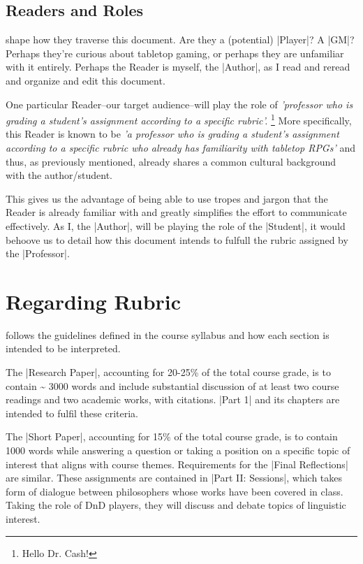 \documentclass[10pt,twoside,twocolumn,openany,nomultitoc]{book}
\begin{document}
 \subsection{Readers and Roles}   
     shape how they traverse this document.  Are they a (potential) |Player|? A |GM|? Perhaps they're curious about tabletop gaming, or perhaps they are unfamiliar with it entirely. Perhaps the Reader is myself, the |Author|, as I read and reread and organize and edit this document.

        One particular Reader--our target audience--will play the role of \textit{'professor who is grading a student's assignment according to a specific rubric'.} 
       \footnote{Hello Dr. Cash!} 
        More specifically, this Reader is known to be \textit{'a professor who is grading a student's assignment according to a specific rubric who already has familiarity with tabletop RPGs'} and thus, as previously mentioned, already shares a common cultural background with the author/student.

    This gives us the advantage of being able to use tropes and jargon that the Reader is already familiar with and greatly simplifies the effort to communicate effectively. As I, the |Author|, will be playing the role of the |Student|, it would behoove us to detail how this document intends to fulfull the rubric assigned by the |Professor|. 
 
 \section{Regarding Rubric}\vspace{6pt}
     follows the guidelines defined in the course syllabus and how each section is intended to be interpreted. 
    
    The |Research Paper|, accounting for 20-25\% of the total course grade, is to contain \~{} 3000 words and include substantial discussion of at least two course readings and two academic works, with citations. |Part 1| and its chapters are intended to fulfil these criteria. %
    
    The |Short Paper|, accounting for 15\% of the total course grade, is to contain 1000 words while answering a question or taking a position on a specific topic of interest that aligns with course themes. Requirements for the |Final Reflections| are similar. These assignments are contained in |Part II: Sessions|, which takes form of dialogue between philosophers whose works have been covered in class. Taking the role of DnD players, they will discuss and debate topics of linguistic interest. 
    
\end{document}
